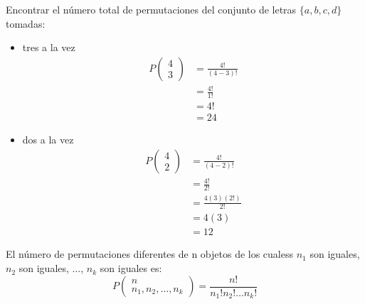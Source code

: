 \begin{ejemplo}
    Encontrar el número total de permutaciones del conjunto de letras $\{a,b,c,d\}$ tomadas:
    \begin{itemize}
        \item tres a la vez
              \begin{align*}
                  P\left(\begin{matrix}
                          4 \\
                          3
                      \end{matrix}\right) & = \frac{4!}{(4-3)!} \\
                                                          & = \frac{4!}{1!}     \\
                                                          & = 4!                \\
                                                          & = 24
              \end{align*}
        \item dos a la vez
              \begin{align*}
                  P\left(\begin{matrix}
                          4 \\
                          2
                      \end{matrix}\right) & = \frac{4!}{(4-2)!}   \\
                                                          & = \frac{4!}{2!}       \\
                                                          & = \frac{4(3)(2!)}{2!} \\
                                                          & = 4(3)                \\
                                                          & =12
              \end{align*}
    \end{itemize}
\end{ejemplo}
\begin{teorema}
    El número de permutaciones diferentes de n objetos de los cualess $n_1$ son iguales, $n_2$ son iguales, $\dots$, $n_k$ son iguales es:
    \begin{equation*}
        P\left(\begin{matrix}
                n \\
                n_1,n_2,\dots,n_k
            \end{matrix}\right) = \frac{n!}{n_1!n_2!\dots n_k!}
    \end{equation*}
\end{teorema}
